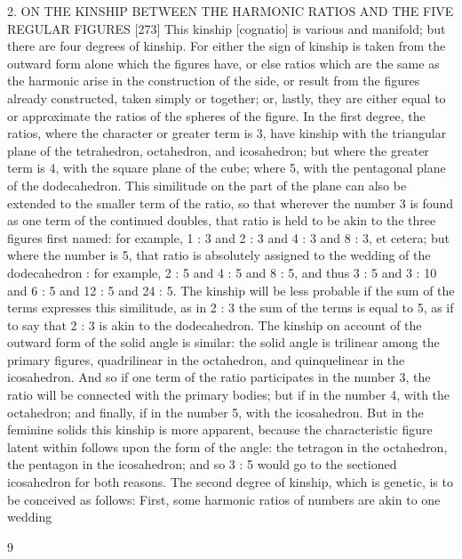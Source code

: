 \documentclass{article}
\begin{document}
2. ON THE KINSHIP BETWEEN THE HARMONIC
RATIOS AND THE FIVE REGULAR FIGURES
[273] This kinship [cognatio] is various and manifold; but there are four
degrees of kinship. For either the sign of kinship is taken from the
outward form alone which the figures have, or else ratios which are the
same as the harmonic arise in the construction of the side, or result from
the figures already constructed, taken simply or together; or, lastly, they
are either equal to or approximate the ratios of the spheres of the figure.
In the first degree, the ratios, where the character or greater term is 3,
have kinship with the triangular plane of the tetrahedron, octahedron,
and icosahedron; but where the greater term is 4, with the square plane
of the cube; where 5, with the pentagonal plane of the dodecahedron.
This similitude on the part of the plane can also be extended to the
smaller term of the ratio, so that wherever the number 3 is found as one
term of the continued doubles, that ratio is held to be akin to the three
figures first named: for example, 1 : 3 and 2 : 3 and 4 : 3 and 8 : 3, et
cetera; but where the number is 5, that ratio is absolutely assigned to the
wedding of the dodecahedron : for example, 2 : 5 and 4 : 5 and 8 : 5, and
thus 3 : 5 and 3 : 10 and 6 : 5 and 12 : 5 and 24 : 5. The kinship will be
less probable if the sum of the terms expresses this similitude, as in 2 : 3
the sum of the terms is equal to 5, as if to say that 2 : 3 is akin to the
dodecahedron. The kinship on account of the outward form of the solid
angle is similar: the solid angle is trilinear among the primary figures,
quadrilinear in the octahedron, and quinquelinear in the icosahedron.
And so if one term of the ratio participates in the number 3, the ratio will
be connected with the primary bodies; but if in the number 4, with the
octahedron; and finally, if in the number 5, with the icosahedron. But in
the feminine solids this kinship is more apparent, because the
characteristic figure latent within follows upon the form of the angle: the
tetragon in the octahedron, the pentagon in the icosahedron; and so 3 : 5
would go to the sectioned icosahedron for both reasons.
The second degree of kinship, which is genetic, is to be conceived as
follows: First, some harmonic ratios of numbers are akin to one wedding


9
\end{document}
